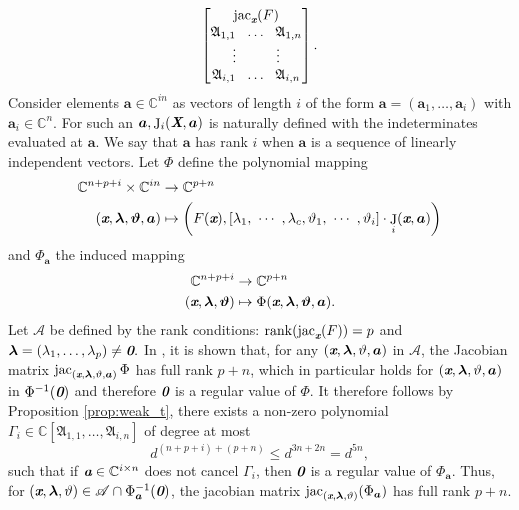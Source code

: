 \documentclass[a4paper]{article}
\def\sA{\mathscr{A}}
\def\A{\mathfrak{A}}
\def\bz{\textit{\textbf{0}}}
\def\Xb{\textit{\textbf{X}}}
\def\xb{\textit{\textbf{x}}}
\def\ab{\textit{\textbf{a}}}
\def\vt{\vartheta}
\DeclareMathOperator{\J}{J}
\DeclareMathOperator{\jac}{jac}
\DeclareMathOperator{\rk}{rank}
\def\C{\mathbb{C}}
\def\bbm{\begin{bmatrix}}
\def\ebm{\end{bmatrix}}
\begin{document}
    \[
    \bbm 
    \jac_{\xb}(F)\\
    \A_{1,1}~~ \hdots ~~\A_{1,n}\\
    \vdots\hspace{10mm}\vdots\\
     \A_{i,1}~~ \hdots ~~\A_{i,n}
     \ebm.
    \]
Consider elements $\bm a \in \C^{in}$ as vectors of length $i$ of the form $\bm a = (\bm a_1,\hdots,\bm a_i)$ with $\bm a_i \in \C^n$. For such an $\bm a, \J_i(\Xb,\bm a)$ is naturally defined with the indeterminates evaluated at $\bm a$. We say that $\bm a$ has rank $i$ when $\bm a$ is a sequence of linearly independent vectors. Let $\Phi$ define the polynomial mapping
    \begin{align*}
    \C^{n+p+i}\times \C^{i n} &\rightarrow \C^{p+n}\\
    (\xb,\bm \lambda,\bm \vt, \bm a)&
    \mapsto
    \left(F(\xb),[\lambda_1, ~\cdots~, \lambda_c, \vt_1, ~\cdots~, \vt_i ] \cdot 
    \J_i(\xb,\bm a)
    \right)
    \end{align*}
    and $\Phi_{\bm a}$ the induced mapping   
    \begin{align*}
    \C^{n+p+i} &\rightarrow \C^{p+n}\\
    (\xb,\bm \lambda,\bm \vt)&\mapsto \Phi(\xb,\bm \lambda,\bm \vt,\bm a).
    \end{align*}
    Let $\sA$ be defined by the rank conditions: $\rk (\jac_{\xb}(F))=p$ and $\bm \lambda=(\lambda_1,\hdots,\lambda_p) \not = \bz.$ In \cite[Section 3.2]{BaGiHeSaSh10}, it is shown that, for any $(\xb, \bm \lambda, \vt, \bm a)$ in $\sA$, the Jacobian matrix $\jac_{(\xb, \bm \lambda, \vt, \bm a)}\Phi$ has full rank $p + n$, which in particular holds for $(\xb, \bm \lambda, \vt, \bm a)$ in $\Phi^{-1}(\bz)$ and therefore $\bz$ is a regular value of $\Phi.$ It therefore follows by Proposition \ref{prop:weak_t}, there exists a non-zero polynomial $\Gamma_i \in \C[\A_{1,1},\hdots,\A_{i,n}]$ of degree at most 
    \[
    d^{(n+p+i)+(p+n)} \leq d^{3n+2n} = d^{5n},
    \]
    such that if $\ab \in \C^{i \times n}$ does not cancel $\Gamma_i$, then $\bz$ is a regular value of $\Phi_{\bm a}.$ Thus, for $(\xb, \bm \lambda, \vt) \in \sA \cap \Phi^{-1}_{\bm a}(\bz)$, the jacobian matrix $\jac_{(\xb, \bm \lambda, \vt)}(\Phi_{\bm a})$ has full rank $p+n$.  
    
    
    
   
\end{document}
